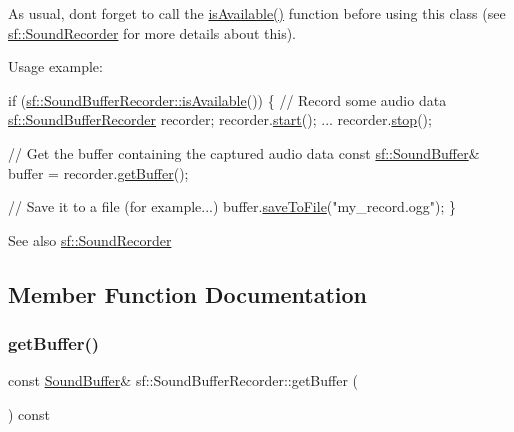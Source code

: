 As usual, don\textquotesingle{}t forget to call the \hyperlink{classsf_1_1_sound_recorder_aab2bd0fee9e48d6cfd449b1cb078ce5a}{is\+Available()} function before using this class (see \hyperlink{classsf_1_1_sound_recorder}{sf\+::\+Sound\+Recorder} for more details about this).

Usage example\+: 
\begin{DoxyCode}
\textcolor{keywordflow}{if} (\hyperlink{classsf_1_1_sound_recorder_aab2bd0fee9e48d6cfd449b1cb078ce5a}{sf::SoundBufferRecorder::isAvailable}())
\{
    \textcolor{comment}{// Record some audio data}
    \hyperlink{classsf_1_1_sound_buffer_recorder}{sf::SoundBufferRecorder} recorder;
    recorder.\hyperlink{classsf_1_1_sound_recorder_a715f0fd2f228c83d79aaedca562ae51f}{start}();
    ...
    recorder.\hyperlink{classsf_1_1_sound_recorder_a8d9c8346aa9aa409cfed4a1101159c4c}{stop}();

    \textcolor{comment}{// Get the buffer containing the captured audio data}
    \textcolor{keyword}{const} \hyperlink{classsf_1_1_sound_buffer}{sf::SoundBuffer}& buffer = recorder.\hyperlink{classsf_1_1_sound_buffer_recorder_aa3a8d7a612cb885ed2f58bb86aa24acb}{getBuffer}();

    \textcolor{comment}{// Save it to a file (for example...)}
    buffer.\hyperlink{classsf_1_1_sound_buffer_aade64260c6375580a085314a30be007e}{saveToFile}(\textcolor{stringliteral}{"my\_record.ogg"});
\}
\end{DoxyCode}


\begin{DoxySeeAlso}{See also}
\hyperlink{classsf_1_1_sound_recorder}{sf\+::\+Sound\+Recorder} 
\end{DoxySeeAlso}


\subsection{Member Function Documentation}
\mbox{\label{classsf_1_1_sound_buffer_recorder_aa3a8d7a612cb885ed2f58bb86aa24acb}} 
\subsubsection{\texorpdfstring{get\+Buffer()}{getBuffer()}}
{\footnotesize\ttfamily const \hyperlink{classsf_1_1_sound_buffer}{Sound\+Buffer}\& sf\+::\+Sound\+Buffer\+Recorder\+::get\+Buffer (\begin{DoxyParamCaption}{ }\end{DoxyParamCaption}) const}



